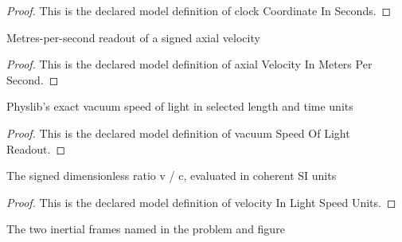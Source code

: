 \begin{proof}
  This is the declared model definition of clock Coordinate In Seconds.
\end{proof}
\begin{definition}
  \label{def:physics:phyx-mini-0529:phyxminiproblems-problemphyxmini0529-axialvelocityinmeterspersecond}
  Metres-per-second readout of a signed axial velocity
\end{definition}
\begin{proof}
  This is the declared model definition of axial Velocity In Meters Per Second.
\end{proof}
\begin{definition}
  \label{def:physics:phyx-mini-0529:phyxminiproblems-problemphyxmini0529-vacuumspeedoflightreadout}
  Physlib's exact vacuum speed of light in selected length and time units
\end{definition}
\begin{proof}
  This is the declared model definition of vacuum Speed Of Light Readout.
\end{proof}
\begin{definition}
  \label{def:physics:phyx-mini-0529:phyxminiproblems-problemphyxmini0529-velocityinlightspeedunits}
  The signed dimensionless ratio v / c, evaluated in coherent SI units
\end{definition}
\begin{proof}
  This is the declared model definition of velocity In Light Speed Units.
\end{proof}
\begin{definition}
  \label{def:physics:phyx-mini-0529:phyxminiproblems-problemphyxmini0529-inertialframelabel}
  The two inertial frames named in the problem and figure
\end{definition}
